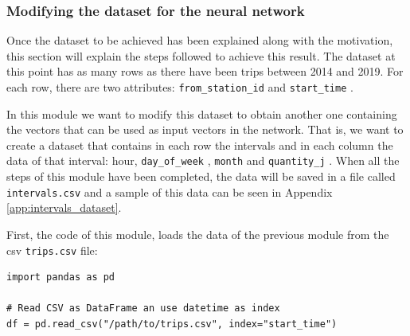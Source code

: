 
\subsubsection{Modifying the dataset for the neural network}\label{dataset-creation}

Once the dataset to be achieved has been explained along with the motivation, this section will explain the steps followed to achieve this result. The dataset at this point has as many rows as there have been trips between 2014 and 2019. For each row, there are two attributes: \small{\verb|from_station_id|} \normalsize  and \small{\verb|start_time|} \normalsize .
\newline


In this module we want to modify this dataset to obtain another one containing the vectors that can be used as input vectors in the network. That is, we want to create a dataset that contains in each row the intervals and in each column the data of that interval: hour, \small{\verb|day_of_week|} \normalsize , \small{\verb|month|} \normalsize  and \small{\verb|quantity_j|} \normalsize . When all the steps of this module have been completed, the data will be saved in a file called \small{\verb|intervals.csv|} \normalsize  and a sample of this data can be seen in Appendix \ref{app:intervals_dataset}.
\newline

First, the code of this module, loads the data of the previous module from the \acrshort{csv} \small{\verb|trips.csv|} \normalsize  file:
\begin{verbatim}
import pandas as pd

# Read CSV as DataFrame an use datetime as index
df = pd.read_csv("/path/to/trips.csv", index="start_time")
\end{verbatim}


